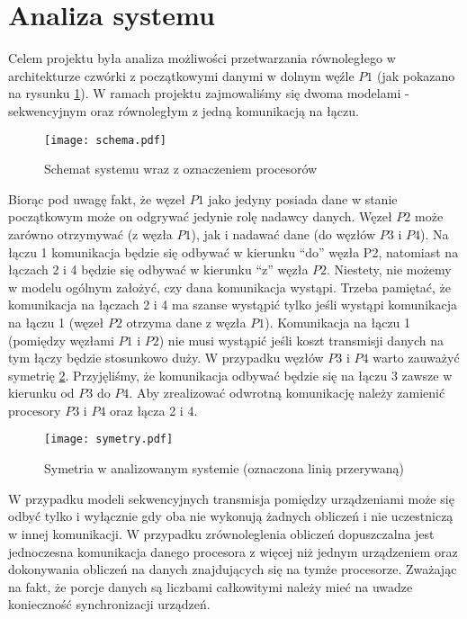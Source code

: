 
\section{Analiza systemu}

Celem projektu była analiza możliwości przetwarzania równoległego w architekturze czwórki z początkowymi danymi w dolnym węźle $P1$ (jak pokazano na rysunku \ref{fig:schema}).
W ramach projektu zajmowaliśmy się dwoma modelami - sekwencyjnym oraz równoległym z jedną komunikacją na łączu.

\begin{figure}[!ht]
\centering
\texttt{[image: schema.pdf]}
\caption{Schemat systemu wraz z oznaczeniem procesorów}
\label{fig:schema}
\end{figure}

Biorąc pod uwagę fakt, że węzeł $P1$ jako jedyny  posiada dane w stanie początkowym może on odgrywać jedynie rolę nadawcy danych.
Węzeł $P2$ może zarówno otrzymywać (z węzła $P1$), jak i nadawać dane (do węzłów $P3$ i $P4$). Na łączu 1 komunikacja będzie się odbywać w kierunku “do” węzła P2,
natomiast na łączach 2 i 4 będzie się odbywać w kierunku “z” węzła $P2$. Niestety, nie możemy w modelu ogólnym założyć, czy dana komunikacja wystąpi.
Trzeba pamiętać, że komunikacja na łączach 2 i 4 ma szanse wystąpić tylko jeśli wystąpi komunikacja na łączu 1 (węzeł $P2$ otrzyma dane z węzła $P1$).
Komunikacja na łączu 1 (pomiędzy węzłami $P1$ i $P2$) nie musi wystąpić jeśli koszt transmisji danych na tym łączy będzie stosunkowo duży.
W przypadku węzłów $P3$ i $P4$ warto zauważyć symetrię \ref{fig:symetry}. Przyjęliśmy, że komunikacja odbywać będzie się na łączu 3 zawsze w kierunku
od $P3$ do $P4$. Aby zrealizować odwrotną komunikację należy zamienić procesory $P3$ i $P4$ oraz łącza 2 i 4.


\begin{figure}[!ht]
\centering
\texttt{[image: symetry.pdf]}
\caption{Symetria w analizowanym systemie (oznaczona linią przerywaną)}
\label{fig:symetry}
\end{figure}

W przypadku modeli sekwencyjnych transmisja pomiędzy urządzeniami może się odbyć tylko i wyłącznie gdy oba nie wykonują żadnych obliczeń i nie uczestniczą w innej komunikacji.
W przypadku zrównoleglenia obliczeń dopuszczalna jest jednoczesna komunikacja danego procesora z więcej niż jednym urządzeniem
oraz dokonywania obliczeń na danych znajdujących się na tymże procesorze.
Zważając na fakt, że porcje danych są liczbami całkowitymi należy mieć na uwadze konieczność synchronizacji urządzeń. \\


